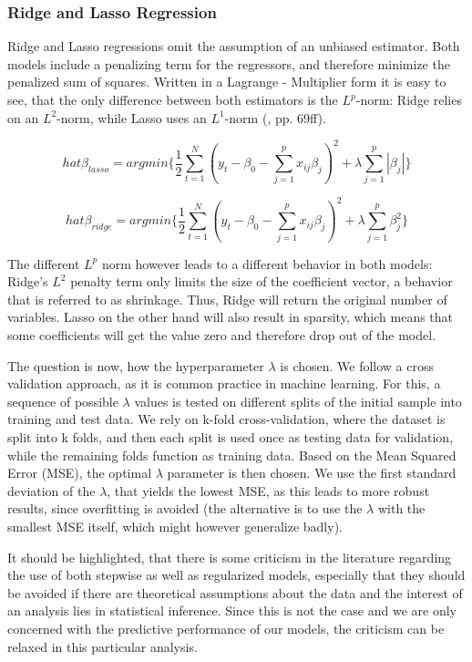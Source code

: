 \subsubsection{Ridge and Lasso Regression}
Ridge and Lasso regressions omit the assumption of an unbiased estimator. Both models include a penalizing term for the regressors, and therefore minimize the penalized sum of squares.  Written in a Lagrange - Multiplier form it is easy to see, that the only difference between both estimators is the $L^{p}$-norm: Ridge relies on an $L^{2}$-norm, while Lasso uses an  $L^{1}$-norm (\cite{friedman_elements_2001}, pp. 69ff).  

\begin{equation}
hat{\beta_{lasso}}=argmin\{\frac{1}{2}\sum_{t=1}^{N}(y_{t}-\beta_{0}-\sum_{j=1}^{p}x_{ij}\beta_{j})^{2}+\lambda\sum_{j=1}^{p}|\beta_{j}|\}
\end{equation}

\begin{equation}
hat{\beta_{ridge}}=argmin\{\frac{1}{2}\sum_{t=1}^{N}(y_{t}-\beta_{0}-\sum_{j=1}^{p}x_{ij}\beta_{j})^{2}+\lambda\sum_{j=1}^{p}\beta_{j}^{2}\}
\end{equation}

The different $L^{p}$ norm however leads to a different behavior in both models: Ridge's $L^2$ penalty term only limits the size of the coefficient vector, a behavior that is referred to as shrinkage. Thus, Ridge will return the original number of variables.  Lasso on the other hand will also result in sparsity, which means that some coefficients will get the value zero and therefore drop out of the model. 

The question is now, how the hyperparameter $\lambda$ is chosen. We follow a cross validation approach, as it is common practice in machine learning. For this, a sequence of possible $\lambda$ values is tested on different splits  of the initial sample into training and test data.  We rely on  k-fold cross-validation, where the dataset is split into k folds, and then each split is used once as testing data for validation, while the remaining folds function as training data. 
Based on the Mean Squared Error (MSE), the optimal $\lambda$ parameter is then chosen. We use the first standard deviation of the $\lambda$, that yields the lowest MSE, as this leads to more robust results, since overfitting is avoided (the alternative is to use the  $\lambda$ with the smallest MSE itself, which might however generalize badly). 

It should be highlighted, that there is some criticism in the literature regarding the use of both stepwise as well as regularized models, especially that they should be avoided if there are theoretical assumptions about the data and the interest of an analysis lies in statistical inference. Since this is not the case and we are only concerned with the predictive performance of our models, the criticism can be relaxed in this particular analysis. 




